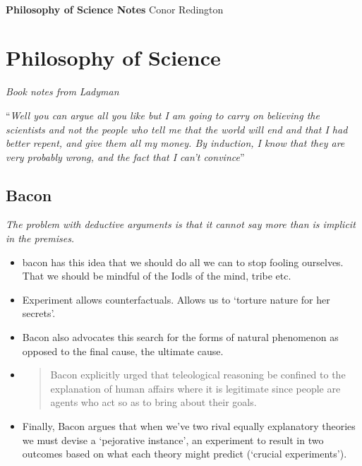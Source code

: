 \documentclass[11pt]{article}
\begin{document}
\thispagestyle{empty}
\bigskip \
\vspace{0.1cm}

\begin{center}
{\fontsize{36}{36} \selectfont \bf \sffamily Philosophy of Science Notes}
\vskip 24pt
{\fontsize{18}{18} \selectfont \rmfamily Conor Redington} 
\vskip 24pt
\end{center}

{\parindent0pt \baselineskip=15.5pt \lipsum[1-4]}

\newpage
\microtoc
\newpage

\hypertarget{philosophy-of-science}{%
\section{Philosophy of Science}\label{philosophy-of-science}}

\emph{Book notes from Ladyman}

``\emph{Well you can argue all you like but I am going to carry on
believing the scientists and not the people who tell me that the world
will end and that I had better repent, and give them all my money. By
induction, I know that they are very probably wrong, and the fact that I
can't convince}''

\hypertarget{bacon}{%
\subsection{Bacon}\label{bacon}}

\emph{The problem with deductive arguments is that it cannot say more
than is implicit in the premises.}

\begin{itemize}
\item
  bacon has this idea that we should do all we can to stop fooling
  ourselves. That we should be mindful of the Iodls of the mind, tribe
  etc.
\item
  Experiment allows counterfactuals. Allows us to `torture nature for
  her secrets'.
\item
  Bacon also advocates this search for the forms of natural phenomenon
  as opposed to the final cause, the ultimate cause.
\item
  \begin{quote}
  Bacon explicitly urged that teleological reasoning be confined to the
  explanation of human affairs where it is legitimate since people are
  agents who act so as to bring about their goals.
  \end{quote}
\item
  Finally, Bacon argues that when we've two rival equally explanatory
  theories we must devise a `pejorative instance', an experiment to
  result in two outcomes based on what each theory might predict
  (`crucial experiments').
\end{itemize}
\end{document}
